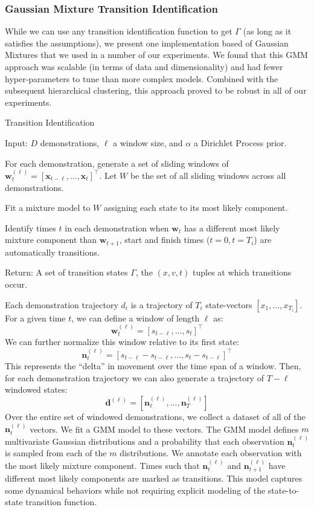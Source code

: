 \subsubsection{Gaussian Mixture Transition Identification}
While we can use any transition identification function to get $\Gamma$ (as long as it satisfies the assumptions), we present one implementation based of Gaussian Mixtures that we used in a number of our experiments.
We found that this GMM approach was scalable (in terms of data and dimensionality) and had fewer hyper-parameters to tune than more complex models.
Combined with the subsequent hierarchical clustering, this approach proved to be robust in all of our experiments.

\begin{algorithm}[t]
\caption{Transition Identification \label{ialgotext}}
\begin{algorithmic}[1]
\State \textsf{Input: } $D$ demonstrations, $\ell$ a window size, and $\alpha$ a Dirichlet Process prior.

\State For each demonstration, generate a set of sliding windows of $\mathbf{w}^{(\ell)}_t = [\mathbf{x}_{t-\ell},...,\mathbf{x}_{t}]^\intercal$. Let $W$ be the set of all sliding windows across all demonstrations.

\State Fit a mixture model to $W$ assigning each state to its most likely component. 

\State Identify times $t$ in each demonstration when $\mathbf{w}_t$ has a different most likely mixture component than $\mathbf{w}_{t+1}$, start and finish times ($t=0,t=T_i$) are automatically transitions. 

\State \textsf{Return: } A set of transition states $\Gamma$, the $(x,v, t)$ tuples at which transitions occur.

\end{algorithmic}

\end{algorithm}

Each demonstration trajectory $d_i$ is a trajectory of $T_i$ state-vectors $[x_1,...,x_{T_i}]$.
For a given time $t$, we can define a window of length $\ell$ as:
\[
\mathbf{w}^{(\ell)}_t = [s_{t-\ell},...,s_{t}]^\intercal
\]
We can further normalize this window relative to its first state:
\[
\mathbf{n}^{(\ell)}_t = [s_{t-\ell}-s_{t-\ell},...,s_{t}-s_{t-\ell}]^\intercal
\]
This represents the ``delta'' in movement over the time span of a window.
Then, for each demonstration trajectory we can also generate a trajectory of $T - \ell$ windowed states:
\[
\mathbf{d}^{(\ell)} = [\mathbf{n}^{(\ell)}_\ell,...,\mathbf{n}^{(\ell)}_{T}]
\]
Over the entire set of windowed demonstrations, we collect a dataset of all of the $\mathbf{n}^{(\ell)}_t$ vectors.
We fit a GMM model to these vectors.
The GMM model defines $m$ multivariate Gaussian distributions and a probability that each observation $\mathbf{n}^{(\ell)}_t$ is sampled from each of the $m$ distributions.
We annotate each observation with the most likely mixture component.
Times such that $\mathbf{n}^{(\ell)}_t$ and $\mathbf{n}^{(\ell)}_{t+1}$ have different most likely components are marked as transitions.
This model captures some dynamical behaviors while not requiring explicit modeling of the state-to-state transition function.

